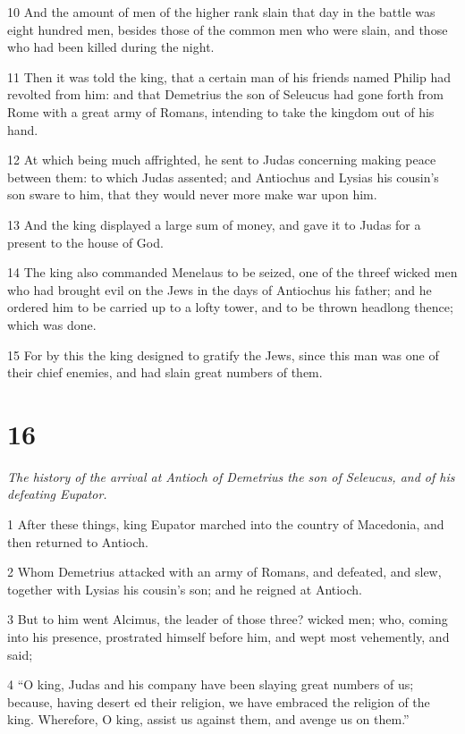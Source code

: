 10 And the amount of men of the higher rank slain that day in the battle was eight hundred men, besides those of the common men who were slain, and those who had been killed during the night.

11 Then it was told the king, that a certain man of his friends named Philip had revolted from him: and that Demetrius the son of Seleucus had gone forth from Rome with a great army of Romans, intending to take the kingdom out of his hand. 

12 At which being much affrighted, he sent to Judas concerning making peace between them: to which Judas assented; and Antiochus and Lysias his cousin’s son sware to him, that they would never more make war upon him. 

13 And the king displayed a large sum of money, and gave it to Judas for a present to the house of God. 

14 The king also commanded Menelaus to be seized, one of the threef wicked men who had brought evil on the Jews in the days of Antiochus his father; and he ordered him to be carried up to a lofty tower, and to be thrown headlong thence; which was done. 

15 For by this the king designed to gratify the Jews, since this man was one of their chief enemies, and had slain great numbers of them. 

\chapter{16}

\par \textit{The history of the arrival at Antioch of Demetrius the son of Seleucus, and of his defeating Eupator.}

1 After these things, king Eupator marched into the country of Macedonia, and then returned to Antioch. 

2 Whom Demetrius attacked with an army of Romans, and defeated, and slew, together with Lysias his cousin’s son; and he reigned at Antioch. 

3 But to him went Alcimus, the leader of those three? wicked men; who, coming into his presence, prostrated himself before him, and wept most vehemently, and said; 

4 “O king, Judas and his company have been slaying great numbers of us; because, having desert ed their religion, we have embraced the religion of the king. Wherefore, O king, assist us against them, and avenge us on them.”

